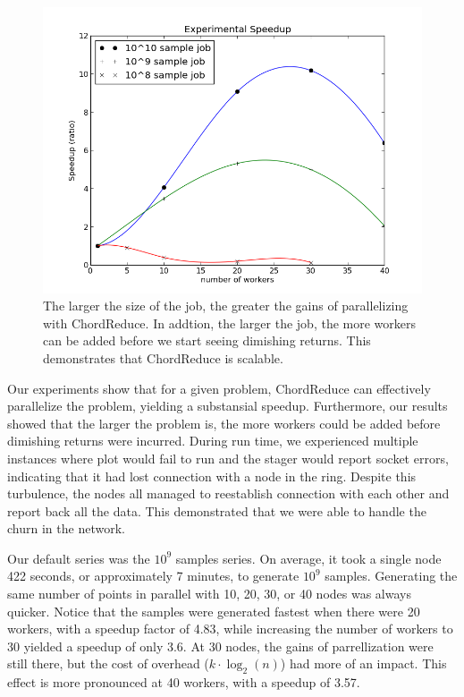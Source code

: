 \documentclass[conference, compsocconf, letterpaper]{IEEEtran}
\begin{document}
\begin{figure}
    \includegraphics[width=\linewidth]{expSpeed}
    \caption{The larger the size of the job, the greater the gains of parallelizing with ChordReduce.  In addtion, the larger the job, the more workers can be added before we start seeing dimishing returns.  This demonstrates that ChordReduce is scalable.}
    \label{expSpeed}
\end{figure}

Our experiments show that for a given problem, ChordReduce can effectively parallelize the problem, yielding a substansial speedup.  Furthermore, our results showed that the larger the problem is, the more workers could be added before dimishing returns were incurred.  During run time, we experienced multiple instances where plot would fail to run and the stager would report socket errors, indicating that it had lost connection with a node in the ring.  Despite this turbulence, the nodes all managed to reestablish connection with each other and report back all the data.  This demonstrated that we were able to handle the churn in the network.

Our default series was the $10^{9}$ samples series.  On average, it took a single node 422 seconds, or approximately 7 minutes, to generate $10^{9}$ samples.  Generating the same number of points in parallel with 10, 20, 30, or 40 nodes was always quicker.  Notice that the samples were generated fastest when there were 20 workers, with a speedup factor of 4.83, while increasing the number of workers to 30 yielded a speedup of only 3.6.  At 30 nodes, the gains of parrellization were still there, but the cost of overhead ($k \cdot \log_{2}(n)$) had more of an impact.  This effect is more pronounced at 40 workers, with a speedup of 3.57.
\end{document}
